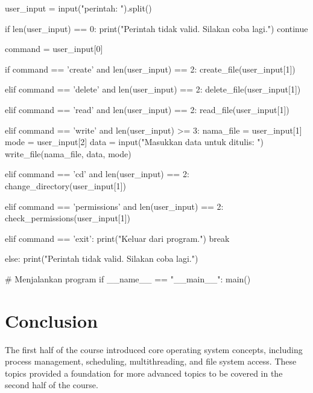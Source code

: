\documentclass[12pt]{article}
\begin{document}
\begin{python}
        user_input = input("\nMasukkan perintah: ").split()

        if len(user_input) == 0:
            print("Perintah tidak valid. Silakan coba lagi.")
            continue

        command = user_input[0]

        if command == 'create' and len(user_input) == 2:
            create_file(user_input[1])

        elif command == 'delete' and len(user_input) == 2:
            delete_file(user_input[1])

        elif command == 'read' and len(user_input) == 2:
            read_file(user_input[1])

        elif command == 'write' and len(user_input) >= 3:
            nama_file = user_input[1]
            mode = user_input[2]
            data = input("Masukkan data untuk ditulis: ")
            write_file(nama_file, data, mode)

        elif command == 'cd' and len(user_input) == 2:
            change_directory(user_input[1])

        elif command == 'permissions' and len(user_input) == 2:
            check_permissions(user_input[1])

        elif command == 'exit':
            print("Keluar dari program.")
            break

        else:
            print("Perintah tidak valid. Silakan coba lagi.")

# Menjalankan program
if __name__ == "__main__":
    main()

\end{python}

\section{Conclusion}
The first half of the course introduced core operating system concepts, including process management, scheduling, multithreading, and file system access. These topics provided a foundation for more advanced topics to be covered in the second half of the course.
\end{document}
